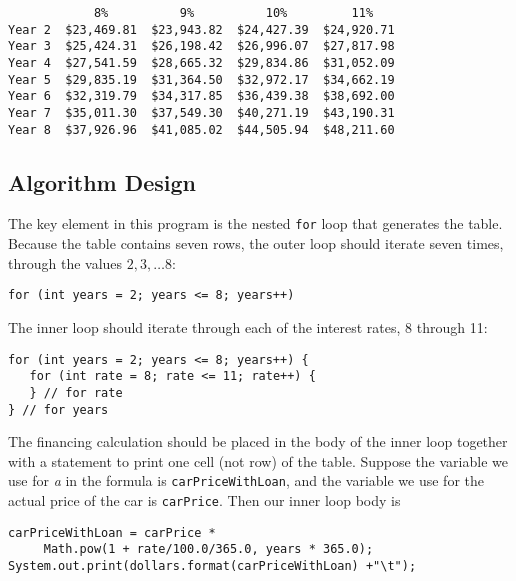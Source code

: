 \begin{jjjlisting}
\begin{lstlisting}
            8%          9%          10%         11%
Year 2  $23,469.81  $23,943.82  $24,427.39  $24,920.71
Year 3  $25,424.31  $26,198.42  $26,996.07  $27,817.98
Year 4  $27,541.59  $28,665.32  $29,834.86  $31,052.09
Year 5  $29,835.19  $31,364.50  $32,972.17  $34,662.19
Year 6  $32,319.79  $34,317.85  $36,439.38  $38,692.00
Year 7  $35,011.30  $37,549.30  $40,271.19  $43,190.31
Year 8  $37,926.96  $41,085.02  $44,505.94  $48,211.60
\end{lstlisting}
\end{jjjlisting}

\subsection*{Algorithm Design}
\noindent The key element in this program is the nested {\tt for} loop 
that generates the table.  Because the table contains seven rows, the
outer loop should 
iterate seven times, through the values $2, 3, \dots 8$:

\begin{jjjlisting}
\begin{lstlisting}
for (int years = 2; years <= 8; years++) 
\end{lstlisting}
\end{jjjlisting}

\noindent The inner loop should iterate through each of the interest rates,
8 through 11:


\begin{jjjlisting}
\begin{lstlisting}
for (int years = 2; years <= 8; years++) { 
   for (int rate = 8; rate <= 11; rate++) {
   } // for rate
} // for years
\end{lstlisting}
\end{jjjlisting}

\noindent The financing calculation should be placed in the body of
the inner loop together with a statement to print one cell (not row)
of the table.  Suppose the variable we use for {\it a} in the formula
is {\tt carPriceWithLoan}, and the variable we use for the actual
price of the car is {\tt carPrice}. Then our inner loop body is


\begin{jjjlisting}
\begin{lstlisting}
carPriceWithLoan = carPrice * 
     Math.pow(1 + rate/100.0/365.0, years * 365.0);
System.out.print(dollars.format(carPriceWithLoan) +"\t");
\end{lstlisting}
\end{jjjlisting}

